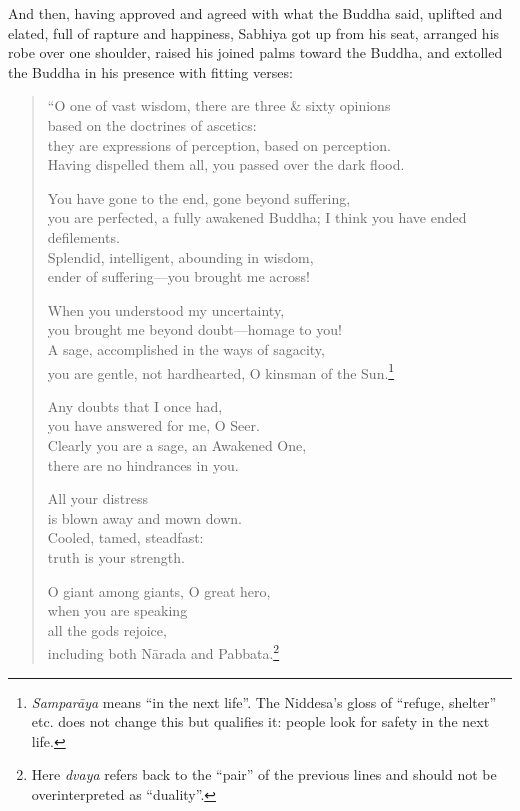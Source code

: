 \documentclass[12pt,openany]{book}%
\begin{document}
And then, having approved and agreed with what the Buddha said, uplifted and elated, full of rapture and happiness, Sabhiya got up from his seat, arranged his robe over one shoulder, raised his joined palms toward the Buddha, and extolled the Buddha in his presence with fitting verses: 

\begin{verse}%
“O one of vast wisdom, there are three \& sixty opinions \\
based on the doctrines of ascetics: \\
they are expressions of perception, based on perception. \\
Having dispelled them all, you passed over the dark flood. 

You have gone to the end, gone beyond suffering, \\
you are perfected, a fully awakened Buddha; I think you have ended defilements. \\
Splendid, intelligent, abounding in wisdom, \\
ender of suffering—you brought me across! 

When you understood my uncertainty, \\
you brought me beyond doubt—homage to you! \\
A sage, accomplished in the ways of sagacity, \\
you are gentle, not hardhearted, O kinsman of the Sun.\footnote{\textit{\textsanskrit{Samparāya}} means “in the next life”. The Niddesa’s gloss of “refuge, shelter” etc. does not change this but qualifies it: people look for safety in the next life. } 

Any doubts that I once had, \\
you have answered for me, O Seer. \\
Clearly you are a sage, an Awakened One, \\
there are no hindrances in you. 

All your distress \\
is blown away and mown down. \\
Cooled, tamed, steadfast: \\
truth is your strength. 

O giant among giants, O great hero, \\
when you are speaking \\
all the gods rejoice, \\
including both \textsanskrit{Nārada} and Pabbata.\footnote{Here \textit{dvaya} refers back to the “pair” of the previous lines and should not be overinterpreted as “duality”. } 


\end{verse}
\end{document}
